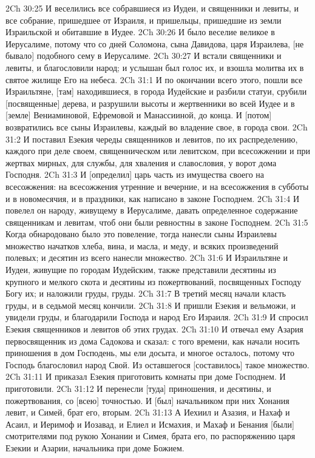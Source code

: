 2Ch 30:25  И веселились все собравшиеся из Иудеи, и священники и левиты, и все собрание, пришедшее от Израиля, и пришельцы, пришедшие из земли Израильской и обитавшие в Иудее.
2Ch 30:26  И было веселие великое в Иерусалиме, потому что со дней Соломона, сына Давидова, царя Израилева, [не бывало] подобного сему в Иерусалиме.
2Ch 30:27  И встали священники и левиты, и благословили народ; и услышан был голос их, и взошла молитва их в святое жилище Его на небеса.
2Ch 31:1  И по окончании всего этого, пошли все Израильтяне, [там] находившиеся, в города Иудейские и разбили статуи, срубили [посвященные] дерева, и разрушили высоты и жертвенники во всей Иудее и в [земле] Вениаминовой, Ефремовой и Манассииной, до конца. И [потом] возвратились все сыны Израилевы, каждый во владение свое, в города свои.
2Ch 31:2  И поставил Езекия череды священников и левитов, по их распределению, каждого при деле своем, священническом или левитском, при всесожжении и при жертвах мирных, для службы, для хваления и славословия, у ворот дома Господня.
2Ch 31:3  И [определил] царь часть из имущества своего на всесожжения: на всесожжения утренние и вечерние, и на всесожжения в субботы и в новомесячия, и в праздники, как написано в законе Господнем.
2Ch 31:4  И повелел он народу, живущему в Иерусалиме, давать определенное содержание священникам и левитам, чтоб они были ревностны в законе Господнем.
2Ch 31:5  Когда обнародовано было это повеление, тогда нанесли сыны Израилевы множество начатков хлеба, вина, и масла, и меду, и всяких произведений полевых; и десятин из всего нанесли множество.
2Ch 31:6  И Израильтяне и Иудеи, живущие по городам Иудейским, также представили десятины из крупного и мелкого скота и десятины из пожертвований, посвященных Господу Богу их; и наложили груды, груды.
2Ch 31:7  В третий месяц начали класть груды, и в седьмой месяц кончили.
2Ch 31:8  И пришли Езекия и вельможи, и увидели груды, и благодарили Господа и народ Его Израиля.
2Ch 31:9  И спросил Езекия священников и левитов об этих грудах.
2Ch 31:10  И отвечал ему Азария первосвященник из дома Садокова и сказал: с того времени, как начали носить приношения в дом Господень, мы ели досыта, и многое осталось, потому что Господь благословил народ Свой. Из оставшегося [составилось] такое множество.
2Ch 31:11  И приказал Езекия приготовить комнаты при доме Господнем. И приготовили.
2Ch 31:12  И перенесли [туда] приношения, и десятины, и пожертвования, со [всею] точностью. И [был] начальником при них Хонания левит, и Симей, брат его, вторым.
2Ch 31:13  А Иехиил и Азазия, и Нахаф и Асаил, и Иеримоф и Иозавад, и Елиел и Исмахия, и Махаф и Бенания [были] смотрителями под рукою Хонании и Симея, брата его, по распоряжению царя Езекии и Азарии, начальника при доме Божием.
